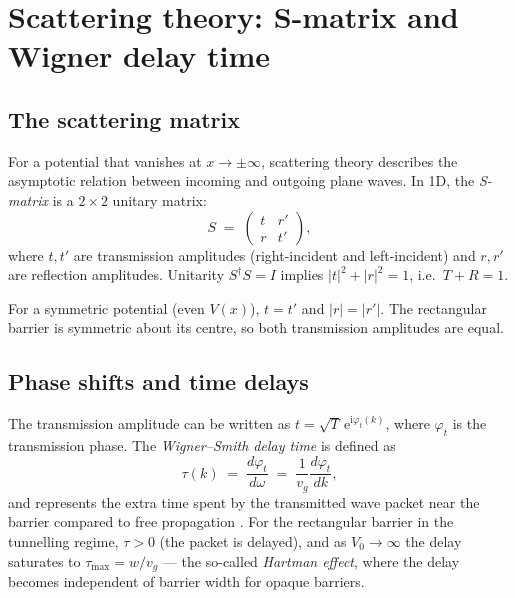 \documentclass[12pt, a4paper]{article}
\newcommand{\ii}{\mathrm{i}}          %
\newcommand{\ee}{\mathrm{e}}          %
\begin{document}
\section{Scattering theory: S-matrix and Wigner delay time}
\label{app:scattering}

\subsection{The scattering matrix}

For a potential that vanishes at $x \to \pm\infty$, scattering theory
describes the asymptotic relation between incoming and outgoing plane
waves.  In 1D, the \emph{S-matrix} is a $2\times 2$ unitary matrix:
\begin{equation}
  S \;=\;
  \begin{pmatrix}
    t   & r' \\
    r   & t'
  \end{pmatrix},
\end{equation}
where $t, t'$ are transmission amplitudes (right-incident and
left-incident) and $r, r'$ are reflection amplitudes.  Unitarity
$S^\dagger S = I$ implies $|t|^2 + |r|^2 = 1$, i.e.\ $T + R = 1$.

For a symmetric potential (even $V(x)$), $t = t'$ and $|r| = |r'|$.
The rectangular barrier is symmetric about its centre, so both
transmission amplitudes are equal.

\subsection{Phase shifts and time delays}

The transmission amplitude can be written as
$t = \sqrt{T}\,\ee^{\ii\varphi_t(k)}$, where $\varphi_t$ is the
transmission phase.  The \emph{Wigner--Smith delay time} is defined as
\begin{equation}
  \tau(k) \;=\; \frac{d\varphi_t}{d\omega}
  \;=\; \frac{1}{v_g}\frac{d\varphi_t}{dk},
  \label{eq:wigner}
\end{equation}
and represents the extra time spent by the transmitted wave packet
near the barrier compared to free propagation \cite{Wigner1955}.
For the rectangular barrier in the tunnelling regime,
$\tau > 0$ (the packet is delayed), and as $V_0 \to \infty$ the
delay saturates to $\tau_\text{max} = w/v_g$ — the so-called
\emph{Hartman effect}, where the delay becomes independent of
barrier width for opaque barriers.
\end{document}
